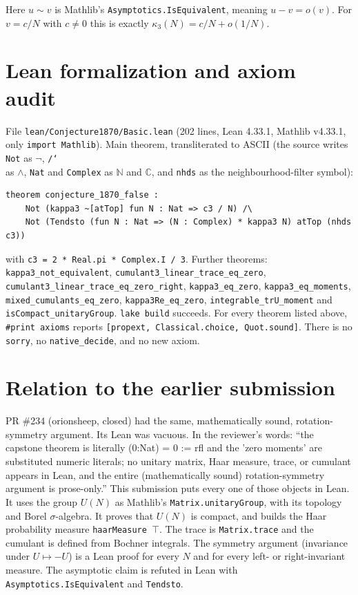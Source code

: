 \documentclass[11pt]{article}
\theoremstyle{definition}
\begin{document}
Here $u\sim v$ is Mathlib's \texttt{Asymptotics.IsEquivalent}, meaning $u-v=o(v)$. For $v=c/N$
with $c\ne0$ this is exactly $\kappa_3(N)=c/N+o(1/N)$.

\section{Lean formalization and axiom audit}

File \texttt{lean/Conjecture1870/Basic.lean} (202 lines, Lean 4.33.1, Mathlib v4.33.1, only
\texttt{import Mathlib}). Main theorem, transliterated to ASCII (the source writes \texttt{Not} as
$\neg$, \texttt{/\char`\\} as $\wedge$, \texttt{Nat} and \texttt{Complex} as $\mathbb{N}$ and
$\mathbb{C}$, and \texttt{nhds} as the neighbourhood-filter symbol):
\begin{verbatim}
theorem conjecture_1870_false :
    Not (kappa3 ~[atTop] fun N : Nat => c3 / N) /\
    Not (Tendsto (fun N : Nat => (N : Complex) * kappa3 N) atTop (nhds c3))
\end{verbatim}
with \texttt{c3 = 2 * Real.pi * Complex.I / 3}. Further theorems: \texttt{kappa3\_not\_equivalent},
\texttt{cumulant3\_linear\_trace\_eq\_zero}, \texttt{cumulant3\_linear\_trace\_eq\_zero\_right},
\texttt{kappa3\_eq\_zero}, \texttt{kappa3\_eq\_moments}, \texttt{mixed\_cumulants\_eq\_zero},
\texttt{kappa3Re\_eq\_zero}, \texttt{integrable\_trU\_moment} and \texttt{isCompact\_unitaryGroup}.
\texttt{lake build} succeeds. For every theorem listed above, \texttt{\#print axioms} reports
\texttt{[propext, Classical.choice, Quot.sound]}. There is no \texttt{sorry}, no
\texttt{native\_decide}, and no new axiom.

\section{Relation to the earlier submission}

PR \#234 (orionsheep, closed) had the same, mathematically sound, rotation-symmetry argument.
Its Lean was vacuous. In the reviewer's words: ``the capstone theorem is literally (0:Nat) = 0 :=
rfl and the 'zero moments' are substituted numeric literals; no unitary matrix, Haar measure,
trace, or cumulant appears in Lean, and the entire (mathematically sound) rotation-symmetry
argument is prose-only.'' This submission puts every one of those objects in Lean. It uses the
group $U(N)$ as Mathlib's \texttt{Matrix.unitaryGroup}, with its topology and Borel
$\sigma$-algebra. It proves that $U(N)$ is compact, and builds the Haar probability measure
\texttt{haarMeasure $\top$}. The trace is \texttt{Matrix.trace} and the cumulant is defined
from Bochner integrals. The symmetry argument (invariance under $U\mapsto -U$) is a Lean proof
for every $N$ and for every left- or right-invariant measure. The asymptotic claim is refuted in
Lean with \texttt{Asymptotics.IsEquivalent} and \texttt{Tendsto}.
\end{document}

